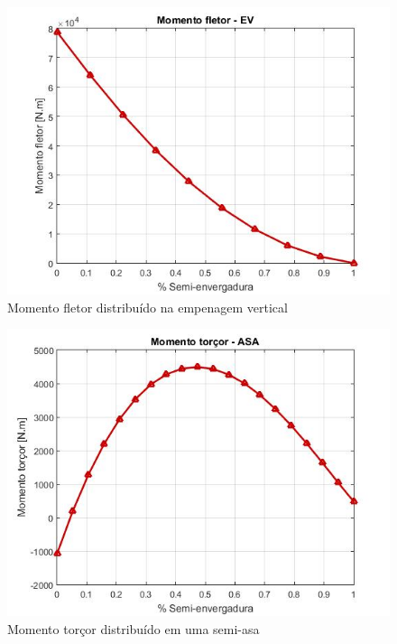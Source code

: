 \begin{figure}
\centering
\includegraphics[width=\textwidth]{cargas/imagens/flet_EV.JPG}
\caption{Momento fletor distribuído na empenagem vertical}
\label{fig:flet_EV}
\end{figure}

\begin{figure}
\centering
\includegraphics[width=\textwidth]{cargas/imagens/torc_ASA.JPG}
\caption{Momento torçor distribuído em uma semi-asa}
\label{fig:torc_ASA}
\end{figure}


